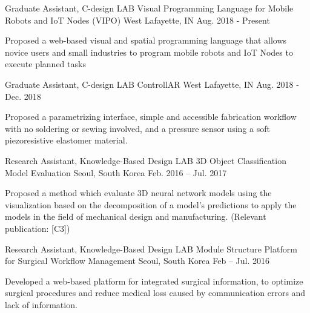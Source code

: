 \begin{cventries}

\cventry
{Graduate Assistant, C-design LAB} %
{Visual Programming Language for Mobile Robots and IoT Nodes (VIPO)} %
{West Lafayette, IN} %
{Aug. 2018 - Present} %
{ %
\begin{cvitems}
\item {Proposed a web-based visual and spatial programming language that allows novice users and small industries to program mobile robots and IoT Nodes to execute planned tasks}
\end{cvitems} 
}


\cventry
{Graduate Assistant, C-design LAB} %
{ControllAR} %
{West Lafayette, IN} %
{Aug. 2018 - Dec. 2018} %
{ %
\begin{cvitems}
\item {Proposed a parametrizing interface, simple and accessible fabrication workflow with no soldering or sewing involved, and a pressure sensor using a soft piezoresistive elastomer material.}
\end{cvitems}
}


\cventry
{Research Assistant, Knowledge-Based Design LAB} %
{3D Object Classification Model Evaluation} %
{Seoul, South Korea} %
{Feb. 2016 – Jul. 2017} %
{ %
\begin{cvitems}
\item {Proposed a method which evaluate 3D neural network models using the visualization based on the decomposition of a model’s predictions to apply the models in the field of mechanical design and manufacturing. (Relevant publication: [C3])}
\end{cvitems}
}


\cventry
{Research Assistant, Knowledge-Based Design LAB} %
{Module Structure Platform for Surgical Workflow Management} %
{Seoul, South Korea} %
{Feb – Jul. 2016} %
{ %
\begin{cvitems}
\item {Developed a web-based platform for integrated surgical information, to optimize surgical procedures and reduce medical loss caused by communication errors and lack of information.}
\end{cvitems}
}


\end{cventries}